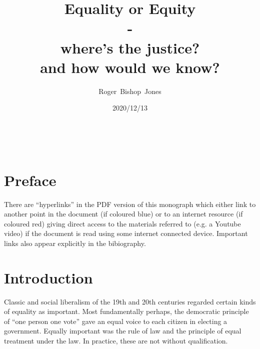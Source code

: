 \documentclass[10pt,titlepage]{article}
\title{\bf{\LARGE Equality or Equity\\-\\where's the justice?}\small\\and how would we know?}
\author{Roger~Bishop~Jones}
\date{\small 2020/12/13}
\newcommand{\ignore}[1]{}
\begin{document}
% 
                               
\begin{titlepage}
\maketitle





\end{titlepage}

\ \

\ignore{
\begin{centering}
{}
\end{centering}
}%

\setcounter{tocdepth}{2}
{\parskip-0pt\tableofcontents}


\pagebreak

\section*{Preface}


There are ``hyperlinks'' in the PDF version of this monograph which either link to another point in the document  (if coloured blue) or to an internet resource  (if coloured red) giving direct access to the materials referred to (e.g. a Youtube video) if the document is read using some internet connected device.
Important links also appear explicitly in the bibiography.

\section{Introduction}

Classic and social liberalism of the 19th and 20th centuries regarded certain kinds of equality as important.
Most fundamentally perhaps, the democratic principle of ``one person one vote'' gave an equal voice to each citizen in electing a government.
Equally important was the rule of law and the principle of equal treatment under the law.
In practice, these are not without qualification.
\end{document}
